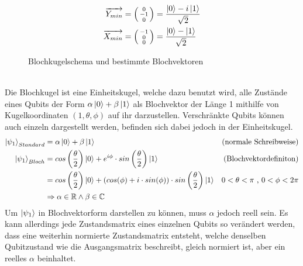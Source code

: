 \documentclass[12pt]{report}
\begin{document}
\begin{figure}[h]
\begin{subfigure}{.27\textwidth}
\begin{align*}
  			\overrightarrow{Y_{min}} &= \left( \begin{smallmatrix} 0\\-1\\0 \end{smallmatrix} \right) = \frac{\ket{0}-i\ket{1}}{\sqrt{2}} \\
  			\overrightarrow{X_{min}} &= \left( \begin{smallmatrix} -1\\0\\0 \end{smallmatrix} \right) = \frac{\ket{0}-\ket{1}}{\sqrt{2}} 		
  		\end{align*}
  		\vspace{0.62cm}
		\end{subfigure}
		\caption{Blochkugelschema und bestimmte Blochvektoren}
	\end{figure}\\
	Die Blochkugel ist eine Einheitskugel, welche dazu benutzt wird, alle Zustände eines Qubits der Form $\alpha\ket{0} + \beta\ket{1}$ als Blochvektor der Länge 1 mithilfe von Kugelkoordinaten $(1,\theta,\phi)$ auf ihr darzustellen.
	Verschränkte Qubits können auch einzeln dargestellt werden, befinden sich dabei jedoch in der Einheitskugel.
	\begin{align*}
		\ket{\psi_{1}}_{Standard} &= \alpha\ket{0} + \beta\ket{1} & \text{(normale Schreibweise)}\\
		\ket{\psi_{1}}_{Bloch} &= cos\left(\frac{\theta}{2}\right)\ket{0} + e^{i\phi}\cdot sin\left(\frac{\theta}{2}\right)\ket{1} & \text{(Blochvektordefiniton)} \\
		&= cos\left(\frac{\theta}{2}\right)\ket{0} +\left( cos(\phi)+i\cdot sin(\phi) \right)\cdot sin\left(\frac{\theta}{2}\right)\ket{1} & 0 < \theta < \pi\text{ , }0 < \phi < 2 \pi\\
		&\Rightarrow \alpha \in \mathbb{R} \wedge \beta \in \mathbb{C}
	\end{align*}
Um $\ket{\psi_{1}}$ in Blochvektorform darstellen zu können, muss $\alpha$ jedoch reell sein. Es kann allerdings jede Zustandsmatrix eines einzelnen Qubits so verändert werden, dass eine weiterhin normierte Zustandsmatrix entsteht, welche denselben Qubitzustand wie die Ausgangsmatrix beschreibt, gleich normiert ist, aber ein reelles $\alpha$ beinhaltet.
\\
\end{document}
